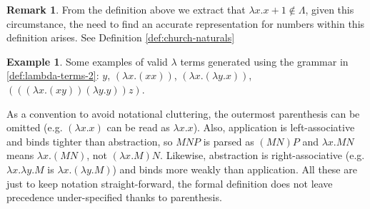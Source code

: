 \documentclass[12pt]{book}
\newcommand{\la}{\lambda}
\newcommand{\La}{\Lambda}
\theoremstyle{plain}
\theoremstyle{definition}
\theoremstyle{definition}
\newtheorem{example}{Example}[section]
\theoremstyle{definition}
\newtheorem{remark}{Remark}
\begin{document}
\begin{remark}
  From the definition above we extract that \( \lambda x . x + 1 \notin \La \), given this circumstance, the need to find an accurate representation for numbers within this definition arises. See Definition \ref{def:church-naturals}
\end{remark}
\begin{example} Some examples of valid $\la$ terms generated using the grammar in \ref{def:lambda-terms-2}:
  \( y \),
  \( (\la x. (x x)) \),
  \( (\la x. (\la y. x)) \),
  \( (((\la x. (x y)) (\la y. y)) z) \).
\end{example}
As a convention to avoid notational cluttering, the outermost parenthesis can be omitted (e.g. $ ( \la x.x ) $ can be read as $ \la x.x $). Also, application is left-associative  and binds tighter than abstraction, so $M N P$ is parsed as $(M N) P$ and $\la x . M N$ means $\la x . (M N)$, not $(\la x . M) N$. Likewise, abstraction is right-associative (e.g. $\la x . \la y . M$ is $\la x . (\la y . M)$) and binds more weakly than application. All these are just to keep notation straight-forward, the formal definition does not leave precedence under-specified thanks to parenthesis.
\end{document}
